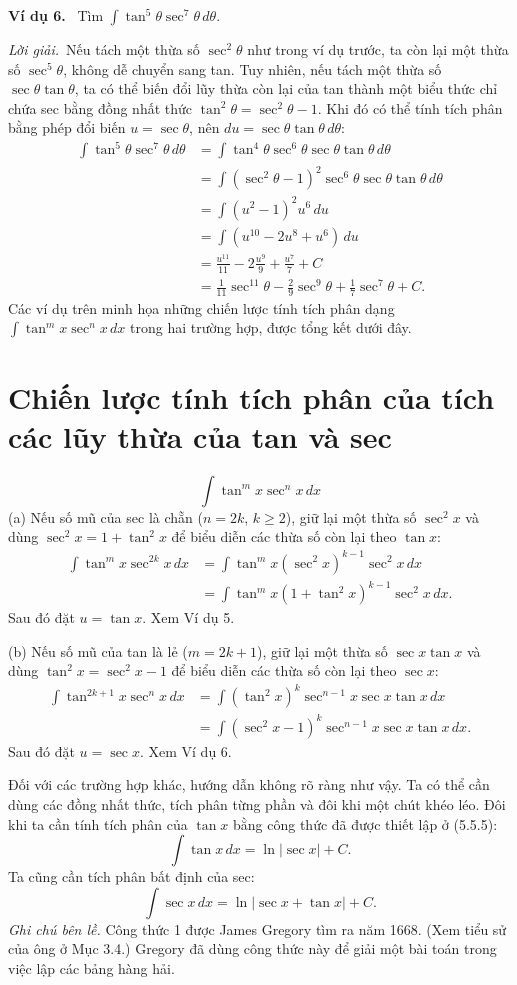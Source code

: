 \documentclass[12pt,a4paper]{article}
\newcommand{\ex}[1]{\par\medskip\noindent\textbf{Ví dụ #1.}\ }
\newcommand{\sol}{\par\nopagebreak[4]\noindent\textit{Lời giải.}\ }
\begin{document}
\ex{6} Tìm $\displaystyle\int\tan^5\theta\sec^7\theta\,d\theta$.
\sol Nếu tách một thừa số $\sec^2\theta$ như trong ví dụ trước, ta còn lại một thừa số $\sec^5\theta$, không dễ chuyển sang tan. Tuy nhiên, nếu tách một thừa số $\sec\theta\tan\theta$, ta có thể biến đổi lũy thừa còn lại của tan thành một biểu thức chỉ chứa sec bằng đồng nhất thức $\tan^2\theta=\sec^2\theta-1$. Khi đó có thể tính tích phân bằng phép đổi biến $u=\sec\theta$, nên $du=\sec\theta\tan\theta\,d\theta$:
\begin{align*}
\int\tan^5\theta\sec^7\theta\,d\theta&=\int\tan^4\theta\sec^6\theta\sec\theta\tan\theta\,d\theta\\
&=\int(\sec^2\theta-1)^2\sec^6\theta\sec\theta\tan\theta\,d\theta\\
&=\int(u^2-1)^2u^6\,du\\
&=\int(u^{10}-2u^8+u^6)\,du\\
&=\frac{u^{11}}{11}-2\frac{u^9}{9}+\frac{u^7}{7}+C\\
&=\frac1{11}\sec^{11}\theta-\frac29\sec^9\theta+\frac17\sec^7\theta+C.
\end{align*}
Các ví dụ trên minh họa những chiến lược tính tích phân dạng $\int\tan^mx\sec^nx\,dx$ trong hai trường hợp, được tổng kết dưới đây.

\section*{Chiến lược tính tích phân của tích các lũy thừa của tan và sec}
\[\int\tan^mx\sec^nx\,dx\]
(a) Nếu số mũ của sec là chẵn ($n=2k$, $k\ge2$), giữ lại một thừa số $\sec^2x$ và dùng $\sec^2x=1+\tan^2x$ để biểu diễn các thừa số còn lại theo $\tan x$:
\begin{align*}
\int\tan^mx\sec^{2k}x\,dx&=\int\tan^mx(\sec^2x)^{k-1}\sec^2x\,dx\\
&=\int\tan^mx(1+\tan^2x)^{k-1}\sec^2x\,dx.
\end{align*}
Sau đó đặt $u=\tan x$. Xem Ví dụ 5.

(b) Nếu số mũ của tan là lẻ ($m=2k+1$), giữ lại một thừa số $\sec x\tan x$ và dùng $\tan^2x=\sec^2x-1$ để biểu diễn các thừa số còn lại theo $\sec x$:
\begin{align*}
\int\tan^{2k+1}x\sec^nx\,dx&=\int(\tan^2x)^k\sec^{n-1}x\sec x\tan x\,dx\\
&=\int(\sec^2x-1)^k\sec^{n-1}x\sec x\tan x\,dx.
\end{align*}
Sau đó đặt $u=\sec x$. Xem Ví dụ 6.

Đối với các trường hợp khác, hướng dẫn không rõ ràng như vậy. Ta có thể cần dùng các đồng nhất thức, tích phân từng phần và đôi khi một chút khéo léo. Đôi khi ta cần tính tích phân của $\tan x$ bằng công thức đã được thiết lập ở (5.5.5):
\[\int\tan x\,dx=\ln|\sec x|+C.\]
Ta cũng cần tích phân bất định của sec:
\begin{equation}\int\sec x\,dx=\ln|\sec x+\tan x|+C.\tag{1}\end{equation}
\textit{Ghi chú bên lề.} Công thức 1 được James Gregory tìm ra năm 1668. (Xem tiểu sử của ông ở Mục 3.4.) Gregory đã dùng công thức này để giải một bài toán trong việc lập các bảng hàng hải.
\end{document}
